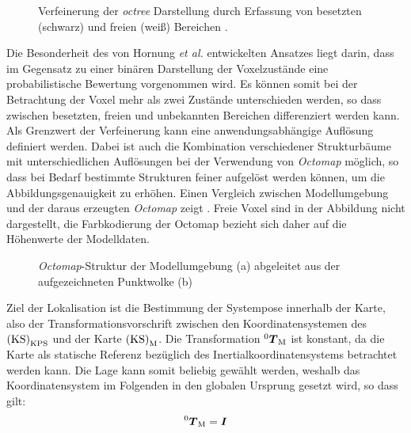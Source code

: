 \begin{figure}[!ht]
	\begin{center}
	\hspace{5mm}
	\caption{Verfeinerung der \textit{octree} Darstellung durch Erfassung von besetzten (schwarz) und freien (weiß) Bereichen \cite{Hornung2013}. }
	\label{fig.octree}
	\end{center}
\end{figure}

Die Besonderheit des von Hornung \textit{et al.} entwickelten Ansatzes liegt darin, dass im Gegensatz zu einer binären Darstellung der Voxelzustände eine probabilistische Bewertung vorgenommen wird. Es können somit bei der Betrachtung der Voxel mehr als zwei Zustände unterschieden werden, so dass zwischen besetzten, freien und unbekannten Bereichen differenziert werden kann. Als Grenzwert der Verfeinerung kann eine anwendungsabhängige Auflösung definiert werden. Dabei ist auch die Kombination verschiedener Strukturbäume mit unterschiedlichen Auflösungen bei der Verwendung von \textit{Octomap} möglich, so dass bei Bedarf bestimmte Strukturen feiner aufgelöst werden können, um die Abbildungsgenauigkeit zu erhöhen. Einen Vergleich zwischen Modellumgebung und der daraus erzeugten \textit{Octomap} zeigt . Freie Voxel sind in der Abbildung nicht dargestellt, die Farbkodierung der Octomap bezieht sich daher auf die Höhenwerte der Modelldaten.\\

\begin{figure}[!ht]
	\begin{center}
	\hspace{5mm}
	\caption{\textit{Octomap}-Struktur der Modellumgebung (a) abgeleitet aus der aufgezeichneten Punktwolke (b)}
	\label{fig.octomap}
	\end{center}
\end{figure}%

\clearpage{}

Ziel der Lokalisation ist die Bestimmung der Systempose innerhalb der Karte, also der Transformationsvorschrift zwischen den Koordinatensystemen des  ${\mathrm{(KS)}}_{\mathrm{KPS}}$ und der Karte ${\mathrm{(KS)}}_{\mathrm{M}}$. Die Transformation ${^{\mathrm{0}}\mbox{\boldmath{$T$}}_{\mathrm{M}}}$ ist konstant, da die Karte als statische Referenz bezüglich des Inertialkoordinatensystems betrachtet werden kann. Die Lage kann somit beliebig gewählt werden, weshalb das Koordinatensystem im Folgenden in den globalen Ursprung gesetzt wird, so dass gilt:
%
\begin{equation}
{^{\mathrm{0}}\mbox{\boldmath{$T$}}_{\mathrm{M}}} = \mbox{\boldmath{$I$}}
\end{equation}

